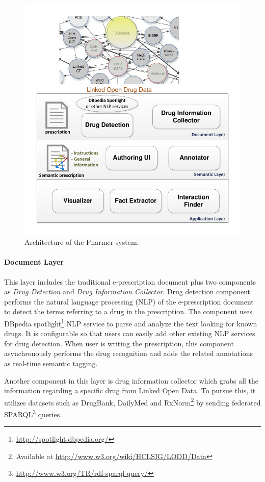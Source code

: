 \documentclass[10pt, conference, compsocconf]{IEEEtran}
\begin{document}
\begin{figure}[tb]
	\centering
		\includegraphics[width=1.0\columnwidth]{images/architecture.pdf}
	\caption{Architecture of the Pharmer system.}
	\label{fig:arch}
\end{figure}

\paragraph{Document Layer} This layer includes the traditional e-prescription document plus two components as \emph{Drug Detection} and \emph{Drug Information Collector}.
Drug detection component performs the natural language processing (NLP) of the e-prescription document to detect the terms referring to a drug in the prescription.
The component uses DBpedia spotlight\footnote{\url{http://spotlight.dbpedia.org/}} NLP service to parse and analyze the text looking for known drugs.
It is configurable so that users can easily add other existing NLP services for drug detection.
When user is writing the prescription, this component asynchronously performs the drug recognition and adds the related annotations as real-time semantic tagging.

Another component in this layer is drug information collector which grabs all the information regarding a specific drug from Linked Open Data.
To pursue this, it utilizes datasets such as DrugBank, DailyMed and RxNorm\footnote{Available at \url{http://www.w3.org/wiki/HCLSIG/LODD/Data}} by sending federated SPARQL\footnote{\url{http://www.w3.org/TR/rdf-sparql-query/}} queries.
\end{document}
